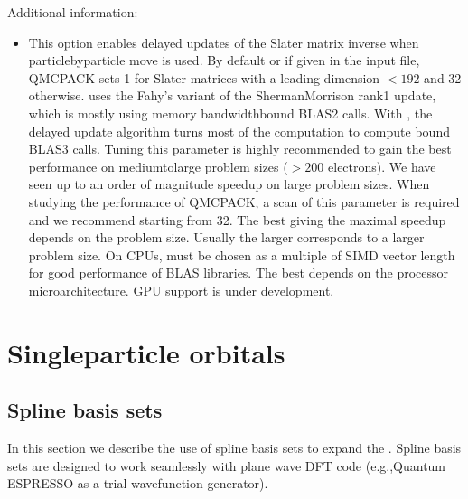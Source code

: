 \documentclass[letterpaper,10pt,english]{sphinxmanual}
\begin{document}
Additional information:
\begin{itemize}
\item {} 
 This option enables delayed updates of the Slater matrix inverse when particle\sphinxhyphen{}by\sphinxhyphen{}particle move is used.
By default or if  given in the input file, QMCPACK sets 1 for Slater matrices with a leading dimension \(<192\) and 32 otherwise.
 uses the Fahy’s variant  of the Sherman\sphinxhyphen{}Morrison rank\sphinxhyphen{}1 update, which is mostly using memory bandwidth\sphinxhyphen{}bound BLAS\sphinxhyphen{}2 calls.
With , the delayed update algorithm  turns most of the computation to compute bound BLAS\sphinxhyphen{}3 calls.
Tuning this parameter is highly recommended to gain the best performance on medium\sphinxhyphen{}to\sphinxhyphen{}large problem sizes (\(>200\) electrons).
We have seen up to an order of magnitude speedup on large problem sizes.
When studying the performance of QMCPACK, a scan of this parameter is required and we recommend starting from 32.
The best  giving the maximal speedup depends on the problem size.
Usually the larger  corresponds to a larger problem size.
On CPUs,  must be chosen as a multiple of SIMD vector length for good performance of BLAS libraries.
The best  depends on the processor microarchitecture.
GPU support is under development.

\end{itemize}


\section{Single\sphinxhyphen{}particle orbitals}
\label{\detokenize{intro_wavefunction:single-particle-orbitals}}\label{\detokenize{intro_wavefunction:singleparticle}}

\subsection{Spline basis sets}
\label{\detokenize{intro_wavefunction:spline-basis-sets}}\label{\detokenize{intro_wavefunction:spo-spline}}
In this section we describe the use of spline basis sets to expand the .
Spline basis sets are designed to work seamlessly with plane wave DFT code (e.g.,Quantum ESPRESSO as a trial wavefunction generator).
\end{document}
